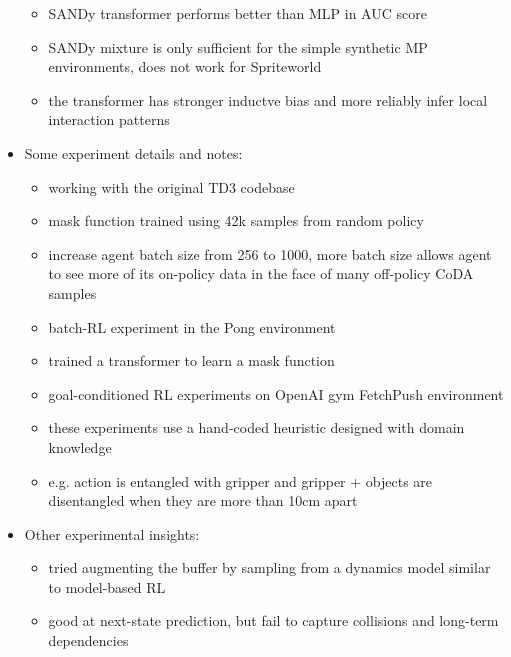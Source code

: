 \begin{itemize}
\begin{itemize}
    \item SANDy transformer performs better than MLP in AUC score
    \item SANDy mixture is only sufficient for the simple synthetic MP environments, does not work for Spriteworld
    \item the transformer has stronger inductve bias and more reliably infer local interaction patterns
  \end{itemize}
  \item Some experiment details and notes:
  \begin{itemize}
    \item working with the original TD3 codebase
    \item mask function trained using 42k samples from random policy
    \item increase agent batch size from 256 to 1000, more batch size allows agent to see more of its on-policy data in the face of many off-policy CoDA samples
    \item batch-RL experiment in the Pong environment
    \item trained a transformer to learn a mask function
    \item goal-conditioned RL experiments on OpenAI gym FetchPush environment
    \item these experiments use a hand-coded heuristic designed with domain knowledge
    \item e.g. action is entangled with gripper and gripper + objects are disentangled when they are more than 10cm apart
  \end{itemize}
  \item Other experimental insights:
  \begin{itemize}
    \item tried augmenting the buffer by sampling from a dynamics model similar to model-based RL
    \item good at next-state prediction, but fail to capture collisions and long-term dependencies
  \end{itemize}
\end{itemize}